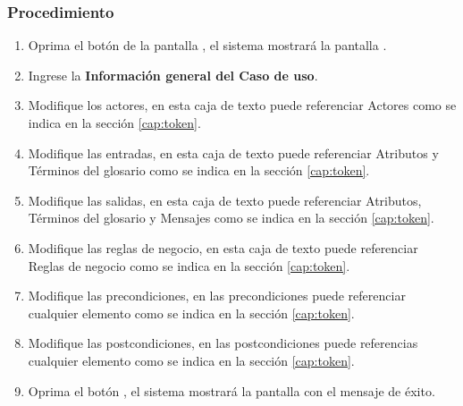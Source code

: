 \subsubsection{Procedimiento}
\begin{enumerate}
	\item Oprima el botón \btnEditar de la pantalla , el sistema mostrará la pantalla . 

	
	\item Ingrese la \textbf{Información general del Caso de uso}.
	
	\item Modifique los actores, en esta caja de texto puede referenciar Actores como se indica en la sección \ref{cap:token}.
	
	\item Modifique las entradas, en esta caja de texto puede referenciar Atributos y Términos del glosario como se indica en la sección \ref{cap:token}.
	
	\item Modifique las salidas, en esta caja de texto puede referenciar Atributos, Términos del glosario y Mensajes como se indica en la sección \ref{cap:token}.
	
	\item Modifique las reglas de negocio, en esta caja de texto puede referenciar Reglas de negocio como se indica en la sección \ref{cap:token}.
	
	\item Modifique las precondiciones, en las precondiciones puede referenciar cualquier elemento como se indica en la sección \ref{cap:token}.
	
	\item Modifique las postcondiciones, en las postcondiciones puede referencias cualquier elemento como se indica en la sección \ref{cap:token}.
	
	\item Oprima el botón , el sistema mostrará la pantalla  con el mensaje de éxito.
\end{enumerate}

